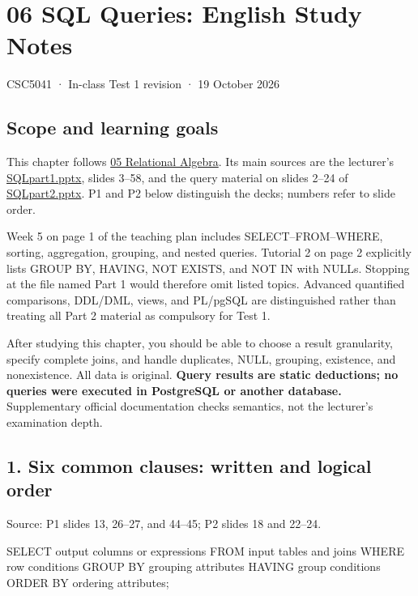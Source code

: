 \clearpage
\section{06 SQL Queries: English Study Notes}\label{06_sql_queries_en}

CSC5041 · In-class Test 1 revision · 19 October 2026

\subsection{Scope and learning goals}\label{06_sql_queries_en-scope-and-learning-goals}

This chapter follows \hyperref[05_relational_algebra_en]{05 Relational Algebra}. Its main sources are the lecturer's \href{../../../slides/SQLpart1.pptx}{SQLpart1.pptx}, slides 3--58, and the query material on slides 2--24 of \href{../../../slides/SQLpart2.pptx}{SQLpart2.pptx}. P1 and P2 below distinguish the decks; numbers refer to slide order.

Week 5 on page 1 of the teaching plan includes SELECT--FROM--WHERE, sorting, aggregation, grouping, and nested queries. Tutorial 2 on page 2 explicitly lists GROUP BY, HAVING, NOT EXISTS, and NOT IN with NULLs. Stopping at the file named Part 1 would therefore omit listed topics. Advanced quantified comparisons, DDL/DML, views, and PL/pgSQL are distinguished rather than treating all Part 2 material as compulsory for Test 1.

After studying this chapter, you should be able to choose a result granularity, specify complete joins, and handle duplicates, NULL, grouping, existence, and nonexistence. All data is original. \textbf{Query results are static deductions; no queries were executed in PostgreSQL or another database.} Supplementary official documentation checks semantics, not the lecturer's examination depth.

\Needspace{11cm}
\subsection{1. Six common clauses: written and logical order}\label{06_sql_queries_en-six-common-clauses-written-and-logical-order}


Source: P1 slides 13, 26--27, and 44--45; P2 slides 18 and 22--24.

\begin{StudyCode}
SELECT output columns or expressions
FROM input tables and joins
WHERE row conditions
GROUP BY grouping attributes
HAVING group conditions
ORDER BY ordering attributes;
\end{StudyCode}

